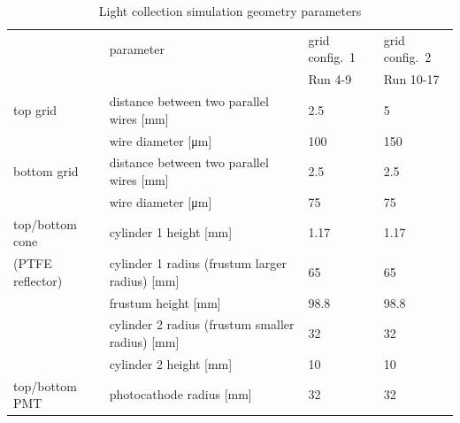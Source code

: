 	\begin{table}[!h]
		\centering
		\begin{tabular}[!h]{ | m{8em} m{20.5em} || m{4.5em} | m{4.5em}|} 
			\hline
				&parameter & grid config.~1 & grid config.~2 \\
				& & Run 4-9 & Run 10-17  \\\hline\hline			
		    top grid & distance between two parallel wires [\si{\mm}] & 2.5	 & 5\\
		    			 & wire diameter [\si{\um}] &  100  & 150 \\\hline
		    bottom grid & distance between two parallel wires [\si{\mm}] & 2.5	 & 2.5 \\
		    			 & wire diameter [\si{\um}] &  75  & 75  \\\hline
		    top/bottom cone %
		                & cylinder 1 height [\si{\mm}] & 1.17 & 1.17 \\
		    (PTFE reflector) 		& cylinder 1 radius (frustum larger radius) [\si{\mm}] & 65 & 65 \\
		    			    & frustum height [\si{\mm}] & 98.8 & 98.8 \\
		    			& cylinder 2 radius (frustum smaller radius) [\si{\mm}] & 32 & 32 \\
		    			& cylinder 2 height [\si{\mm}] & 10 & 10 \\\hline
		    top/bottom PMT & photocathode radius [\si{\mm}] & 32 & 32 \\
		    \hline		    
		\end{tabular}
		\caption[Light collection simulation geometry parameters.]{Light collection simulation geometry parameters}
		\label{tab:LC sim parameter geo}
	\end{table}


